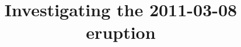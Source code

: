 \documentclass[preprint2]{aastex}
\begin{document}

\title{Investigating the 2011-03-08 eruption}





\end{document}
